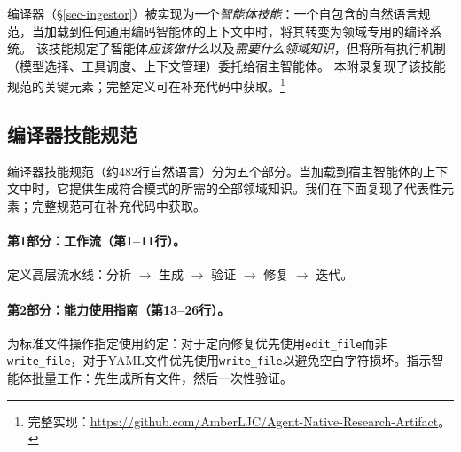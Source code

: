 \ara{} 编译器（\S\ref{sec-ingestor}）被实现为一个\emph{智能体技能}：一个自包含的自然语言规范，当加载到任何通用编码智能体的上下文中时，将其转变为领域专用的编译系统。
该技能规定了智能体\emph{应该做什么}以及\emph{需要什么领域知识}，但将所有执行机制（模型选择、工具调度、上下文管理）委托给宿主智能体。
本附录复现了该技能规范的关键元素；完整定义可在补充代码中获取。\footnote{完整实现：\url{https://github.com/AmberLJC/Agent-Native-Research-Artifact}。}

\subsection{编译器技能规范}
\label{sec-ingestor-prompt}

编译器技能规范（约482行自然语言）分为五个部分。当加载到宿主智能体的上下文中时，它提供生成符合模式的\ara{}所需的全部领域知识。我们在下面复现了代表性元素；完整规范可在补充代码中获取。

\paragraph{第1部分：工作流（第1--11行）。}
定义高层流水线：分析 $\to$ 生成 $\to$ 验证 $\to$ 修复 $\to$ 迭代。

\paragraph{第2部分：能力使用指南（第13--26行）。}
为标准文件操作指定使用约定：对于定向修复优先使用\texttt{edit\_file}而非\texttt{write\_file}，对于YAML文件优先使用\texttt{write\_file}以避免空白字符损坏。指示智能体批量工作：先生成所有文件，然后一次性验证。

